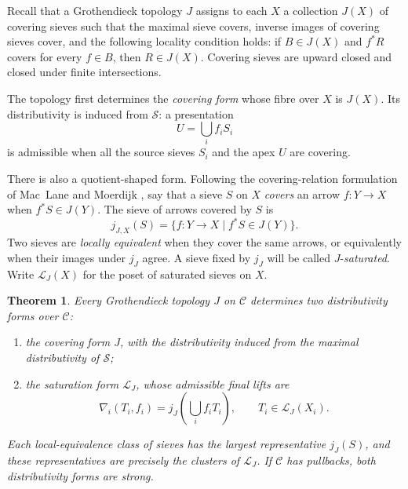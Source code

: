 \documentclass[12pt,oneside,reqno]{amsart}
\newtheorem{theorem}{Theorem}[section]
\theoremstyle{definition}
\theoremstyle{remark}
\newcommand{\C}{\mathcal C}
\newcommand{\Sieve}{\mathscr S}
\newcommand{\Sat}{\mathscr L}
\begin{document}
Recall that a Grothendieck topology \(J\) assigns to each \(X\) a
collection \(J(X)\) of covering sieves such that the maximal sieve
covers, inverse images of covering sieves cover, and the following
locality condition holds: if \(B\in J(X)\) and \(f^*R\) covers for
every \(f\in B\), then \(R\in J(X)\).  Covering sieves are upward
closed and closed under finite intersections.

The topology first determines the \emph{covering form} whose fibre over
\(X\) is \(J(X)\).  Its distributivity is induced from \(\Sieve\): a
presentation
\[
                         U=\bigcup_i f_iS_i
\]
is admissible when all the source sieves \(S_i\) and the apex \(U\)
are covering.

There is also a quotient-shaped form.  Following the covering-relation
formulation of Mac~Lane and Moerdijk
\cite[Chapter~III, Section~2]{MacLaneMoerdijk}, say that a sieve \(S\)
on \(X\) \emph{covers} an arrow \(f:Y\to X\) when \(f^*S\in J(Y)\).
The sieve of arrows covered by \(S\) is
\[
 j_{J,X}(S)=\{f:Y\to X\mid f^*S\in J(Y)\}.
\]
Two sieves are \emph{locally equivalent} when they cover the same
arrows, or equivalently when their images under \(j_J\) agree.  A
sieve fixed by \(j_J\) will be called \(J\)-\emph{saturated}.  Write
\(\Sat_J(X)\) for the poset of saturated sieves on \(X\).

\begin{theorem}\label{thm:topology-gives-two-forms}
Every Grothendieck topology \(J\) on \(\C\) determines two
distributivity forms over \(\C\):
\begin{enumerate}[label=\textup{(\roman*)}]
\item the covering form \(J\), with the distributivity induced from
the maximal distributivity of \(\Sieve\);
\item the saturation form \(\Sat_J\), whose admissible final lifts are
\begin{equation}\label{eq:saturation-final-lift}
 \nabla_i(T_i,f_i)
   =j_J\!\left(\bigcup_i f_iT_i\right),
 \qquad T_i\in\Sat_J(X_i).
\end{equation}
\end{enumerate}
Each local-equivalence class of sieves has the largest representative
\(j_J(S)\), and these representatives are precisely the clusters of
\(\Sat_J\).  If \(\C\) has pullbacks, both distributivity forms are
strong.
\end{theorem}
\end{document}
